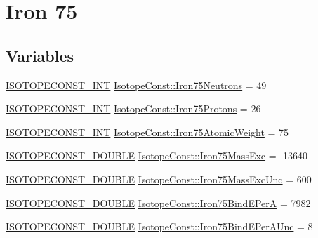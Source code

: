 \hypertarget{group___isotope_const-_iron-_fe75}{}\section{Iron 75}
\label{group___isotope_const-_iron-_fe75}
\subsection*{Variables}
\begin{DoxyCompactItemize}
\item 
\mbox{\hyperlink{group___isotope_const-_macros_ga5f18360b3e99483a35c32d789e62621c}{I\+S\+O\+T\+O\+P\+E\+C\+O\+N\+S\+T\+\_\+\+I\+NT}} \mbox{\hyperlink{group___isotope_const-_iron-_fe75_ga8a5c7fd98e736a04e68ddca183419b58}{Isotope\+Const\+::\+Iron75\+Neutrons}} = 49
\item 
\mbox{\hyperlink{group___isotope_const-_macros_ga5f18360b3e99483a35c32d789e62621c}{I\+S\+O\+T\+O\+P\+E\+C\+O\+N\+S\+T\+\_\+\+I\+NT}} \mbox{\hyperlink{group___isotope_const-_iron-_fe75_gaca44ca66a0c2b97aab34b405572ccab2}{Isotope\+Const\+::\+Iron75\+Protons}} = 26
\item 
\mbox{\hyperlink{group___isotope_const-_macros_ga5f18360b3e99483a35c32d789e62621c}{I\+S\+O\+T\+O\+P\+E\+C\+O\+N\+S\+T\+\_\+\+I\+NT}} \mbox{\hyperlink{group___isotope_const-_iron-_fe75_ga5b6b6b1b441760a22463ba5d48af532c}{Isotope\+Const\+::\+Iron75\+Atomic\+Weight}} = 75
\item 
\mbox{\hyperlink{group___isotope_const-_macros_ga8f45a7272ce02c0b4c65c44636ed719a}{I\+S\+O\+T\+O\+P\+E\+C\+O\+N\+S\+T\+\_\+\+D\+O\+U\+B\+LE}} \mbox{\hyperlink{group___isotope_const-_iron-_fe75_gaa736abaaf406b9829b82dc0bcbf11c0c}{Isotope\+Const\+::\+Iron75\+Mass\+Exc}} = -\/13640
\item 
\mbox{\hyperlink{group___isotope_const-_macros_ga8f45a7272ce02c0b4c65c44636ed719a}{I\+S\+O\+T\+O\+P\+E\+C\+O\+N\+S\+T\+\_\+\+D\+O\+U\+B\+LE}} \mbox{\hyperlink{group___isotope_const-_iron-_fe75_gad0661b11314a119fefeed637998b19c0}{Isotope\+Const\+::\+Iron75\+Mass\+Exc\+Unc}} = 600
\item 
\mbox{\hyperlink{group___isotope_const-_macros_ga8f45a7272ce02c0b4c65c44636ed719a}{I\+S\+O\+T\+O\+P\+E\+C\+O\+N\+S\+T\+\_\+\+D\+O\+U\+B\+LE}} \mbox{\hyperlink{group___isotope_const-_iron-_fe75_ga2a657876778602137f6ab5c04b4c4944}{Isotope\+Const\+::\+Iron75\+Bind\+E\+PerA}} = 7982
\item 
\mbox{\hyperlink{group___isotope_const-_macros_ga8f45a7272ce02c0b4c65c44636ed719a}{I\+S\+O\+T\+O\+P\+E\+C\+O\+N\+S\+T\+\_\+\+D\+O\+U\+B\+LE}} \mbox{\hyperlink{group___isotope_const-_iron-_fe75_ga71ffe97b40329ffcdfa467e31dcbc68c}{Isotope\+Const\+::\+Iron75\+Bind\+E\+Per\+A\+Unc}} = 8

\end{DoxyCompactItemize}
